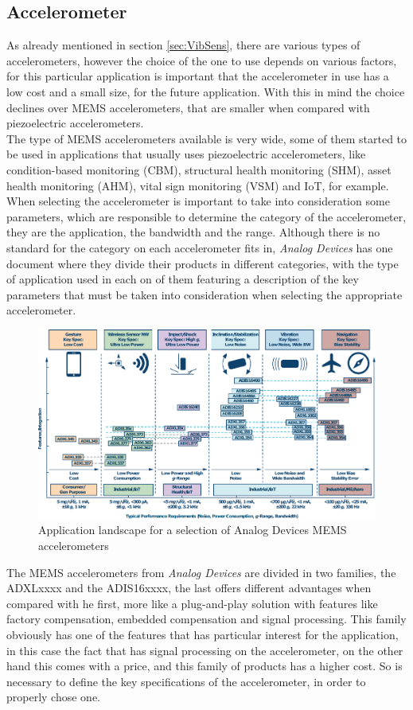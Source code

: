 \subsection{Accelerometer}
As already mentioned in section \ref{sec:VibSens}, there are various types of accelerometers, however the choice of the one to use depends on various factors, for this particular application is important that the accelerometer in use has a low cost and a small size, for the future application. With this in mind the choice declines over MEMS accelerometers, that are smaller when compared with piezoelectric accelerometers.\\
The type of MEMS accelerometers available is very wide, some of them started to be used in applications that usually uses piezoelectric accelerometers, like condition-based monitoring (CBM), structural health monitoring (SHM), asset health monitoring (AHM), vital sign monitoring (VSM) and IoT, for example. When selecting the accelerometer is important to take into consideration some parameters, which are responsible to determine the category of the accelerometer, they are the application, the bandwidth and the range. Although there is no standard for the category on each accelerometer fits in, \textit{Analog Devices} has one document where they divide their products in different categories, with the type of application used in each on of them featuring a description of the key parameters that must be taken into consideration when selecting the appropriate accelerometer.
\begin{figure}[]
    \centering
    \includegraphics[width=1\textwidth]{Chapters/4CHP/Figures/adTable.pdf}
    \caption{Application landscape for a selection of Analog Devices MEMS accelerometers}
    \label{fig:adtable}
\end{figure}
The MEMS accelerometers from \textit{Analog Devices} are divided in two families, the ADXLxxxx and the ADIS16xxxx, the last offers different advantages when compared with he first, more like a plug-and-play solution with features like factory compensation, embedded compensation and signal processing. This family obviously has one of the features that has particular interest for the application, in this case the fact that has signal processing on the accelerometer, on the other hand this comes with a price, and this family of products has a higher cost. So is necessary to define the key specifications of the accelerometer, in order to properly chose one\cite{AnalogDialogue51102017}\cite{AnalogDialogue51112017}.\\
